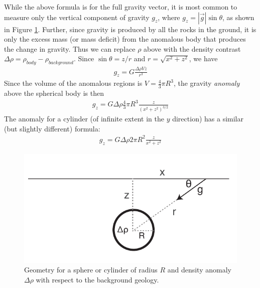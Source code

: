 \documentclass[11pt, oneside]{article}   	%
\begin{document}
While the above formula is for the full gravity vector, it is most common to measure only the vertical component of gravity $g_z$, where $g_z =  |\overrightarrow{g}| \sin \theta$, as shown in Figure \ref{sphere}.  Further,  since gravity is produced by all the rocks in the ground, it is only the excess mass (or mass deficit) from the anomalous body that produces the change in  gravity. Thus we can replace $\rho$ above with the density contrast $\Delta \rho = \rho_{body} - \rho_{background}$. Since $\sin \theta  = z / r$ and $r = \sqrt{ x^2 + z^2}$, we have
 \begin{eqnarray}
	 g_z=   G{\frac {\Delta\rho V z}{r^{3}}}
\end{eqnarray}
Since the volume of the anomalous regions is $V = \frac{4}{3} \pi R^3$, the gravity {\it anomaly} above the spherical body is then
 \begin{eqnarray}
	 g_z=   G\Delta\rho \frac{4}{3} \pi R^3 {\frac { z}{(x^2 + z^2)^{3/2}}}
\end{eqnarray}
The anomaly for a cylinder (of infinite extent in the $y$ direction) has a similar (but slightly different) formula:
 \begin{eqnarray}
	 g_z=   G\Delta\rho 2 \pi R^2 {\frac { z}{x^2 + z^2}}
\end{eqnarray}

\begin{figure}[htbp]
\begin{center}
\includegraphics{sphere.pdf}
\caption{Geometry for a sphere or cylinder of radius $R$ and density anomaly $\Delta \rho$ with respect to the background geology.}
\label{sphere}
\end{center}
\end{figure}
\end{document}
